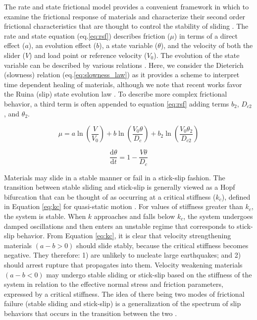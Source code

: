 The rate and state frictional model provides a convenient framework in which to
examine the frictional response of materials and characterize their second order
frictional characteristics that are thought to control the stability of sliding
\cite{Brace_1966,Brace_Byerlee_1969,gu1984slip,marone1998laboratory}.  The rate and state
equation (eq.\ref{eq:rsf}) describes friction ($\mu$) in terms of a direct
effect ($a$), an evolution effect ($b$), a state variable ($\theta$), and the
velocity of both the slider ($V$) and load point or reference velocity ($V_0$).
The evolution of the state variable can be described by various relations
\cite{marone1998laboratory}.  Here, we consider the Dieterich (slowness) relation
(eq.\ref{eq:slowness_law}) as it provides a scheme to interpret time dependent
healing of materials, although we note that recent works favor the Ruina (slip)
state evolution law \cite{Marone2015,bayart2006evolution}.  To describe more
complex frictional behavior, a third term is often appended to   equation
\ref{eq:rsf} adding terms $b_2$, $D_{c2}$, and $\theta_2$.

\begin{equation}
	\mu =  a  \ln\left(\frac{V}{V_0}\right) + b \ln\left(\frac{V_0 \theta}{D_c}\right) + b_2 \ln\left(\frac{V_0 \theta_2}{D_{c2}}\right)
	\label{eq:rsf}
\end{equation}

\begin{equation}
	\frac{\text{d}\theta}{\text{d}t} = 1 - \frac{V \theta}{D_c}
	\label{eq:slowness_law}
\end{equation}


Materials may slide in a stable manner or fail in a stick-slip fashion.  The
transition between stable sliding and stick-slip is generally viewed as a Hopf
bifurcation that can be thought of as occurring at a critical stiffness ($k_c$),
defined in Equation \ref{eq:kc} for quasi-static motion
\cite{Rice_1983,gu1984slip}.  For values of stiffness greater than $k_c$, the
system is stable.  When $k$ approaches and falls below $k_c$, the system
undergoes damped oscillations and then enters an unstable regime that
corresponds to stick-slip behavior.  From Equation \ref{eq:kc}, it is clear that
velocity strengthening materials $(a-b > 0)$  should slide stably, because
the critical stiffness becomes negative.  They therefore: 1) are unlikely to
nucleate large earthquakes; and 2) should arrest rupture that propagates into
them. Velocity weakening materials $(a-b < 0)$ may undergo stable sliding or
stick-slip based on the stiffness of the system in relation to the effective
normal stress and friction parameters, expressed by a critical stiffness. The
idea of there being two modes of frictional failure (stable sliding and
stick-slip) is a generalization of the spectrum of slip behaviors that occurs in
the transition between the two \cite{Rice_1983}.

